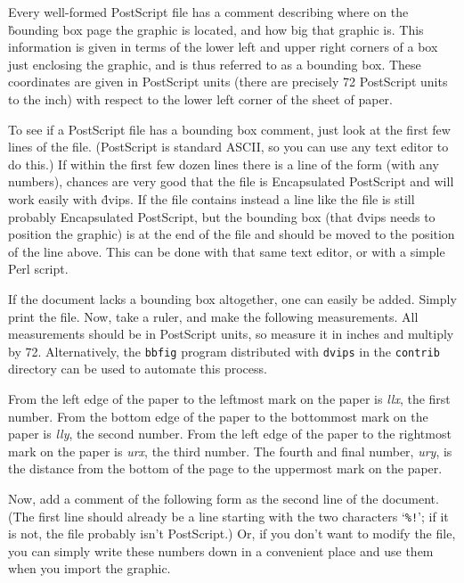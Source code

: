 
Every well-formed PostScript file has a comment describing where on the
\^{bounding box}
page the graphic is located, and how big that graphic is.  This information
is given in terms of the lower left and upper right corners of a box just
enclosing the graphic, and is thus referred to as a bounding box.
These coordinates are given
in PostScript units (there are precisely 72 PostScript units to
the inch) with respect to the lower left corner of the sheet of paper.

To see if a PostScript file has a bounding box comment, just
look at the first few lines of the file.
(PostScript is standard ASCII, so you can use any text editor to do this.)
If within the first few dozen lines there is a line of the form
\noindent
(with any numbers), chances are very good that the file is Encapsulated
PostScript and will work easily with \.{dvips}.  If the file contains
instead a line like
\noindent
the file is still probably Encapsulated PostScript, but the bounding
box (that \.{dvips} needs to position the graphic) is at the end of the
file and should be moved to the position of the line above.  This can be
done with that same text editor, or with a simple Perl script.

If the document lacks a bounding box altogether, one can easily be added.
Simply print the file.  Now, take a ruler, and make the following measurements.
All measurements should be in PostScript units, so measure it in inches and
multiply by 72.  Alternatively, the {\tt bbfig} program distributed with
{\tt dvips} in the {\tt contrib} directory can be used to automate
this process.

From the left edge of the paper to the leftmost mark on the paper is
{\it llx}, the first number.  From the bottom edge of the paper to the
bottommost mark on the paper is {\it lly}, the second number.  From
the left edge of the paper to the rightmost mark on the paper is
{\it urx}, the third number.  The fourth and final number, {\it ury}, is
the distance from the bottom of the page to the uppermost mark on the
paper.

Now, add a comment of the following form as the second line of the document.
(The first line should already be a line starting with the two
characters `{\tt \%!}'; if it is not, the file probably isn't PostScript.)
\noindent
Or, if you don't want to modify the file, you can simply write these
numbers down in a convenient place and use them when you import the
graphic.

